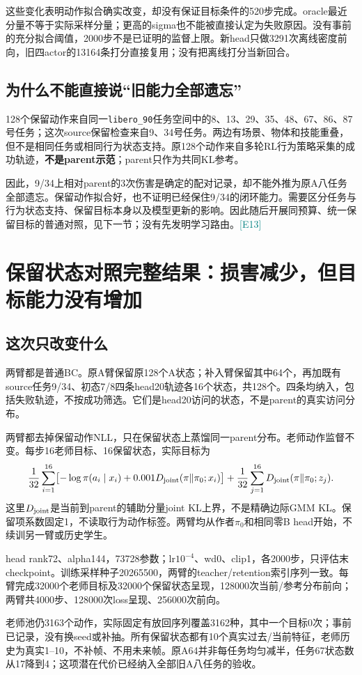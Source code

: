 \documentclass[UTF8,a4paper,fontset=none,zihao=-4]{ctexart}
\newcommand{\ev}[1]{\textcolor{teal}{\small[#1]}}
\begin{document}
这些变化表明动作拟合确实改变，却没有保证目标条件的520步完成。oracle最近分量不等于实际采样分量；更高的sigma也不能被直接认定为失败原因。没有事前的充分拟合阈值，2000步不是已证明的监督上限。新head只做3291次离线密度前向，旧四actor的13164条打分直接复用；没有把离线打分当新回合。
\subsection{为什么不能直接说“旧能力全部遗忘”}
128个保留动作来自同一\texttt{libero\_90}任务空间中的8、13、29、35、48、67、86、87号任务；这次source保留检查来自9、34号任务。两边有场景、物体和技能重叠，但不是相同任务或相同行为状态支持。原128个动作来自多轮RL行为策略采集的成功轨迹，\textbf{不是parent示范}；parent只作为共同KL参考。

因此，9/34上相对parent的3次伤害是确定的配对记录，却不能外推为原A八任务全部遗忘。保留动作拟合好，也不证明已经保住9/34的闭环能力。需要区分任务与行为状态支持、保留目标本身以及模型更新的影响。因此随后开展同预算、统一保留目标的普通对照，见下一节；没有先发明学习路由。\ev{E13}
\section{保留状态对照完整结果：损害减少，但目标能力没有增加}
\subsection{这次只改变什么}
两臂都是普通BC。原A臂保留原128个A状态；补入臂保留其中64个，再加既有source任务9/34、初态7/8四条head20轨迹各16个状态，共128个。四条均纳入，包括失败轨迹，不按成功筛选。它们是head20访问的状态，不是parent的真实访问分布。

两臂都去掉保留动作NLL，只在保留状态上蒸馏同一parent分布。老师动作监督不变。每步16老师目标、16保留状态，实际目标为
\[
\frac{1}{32}\sum_{i=1}^{16}\bigl[-\log\pi(a_i\mid x_i)+0.001D_{\rm joint}(\pi\Vert\pi_0;x_i)\bigr]
+\frac{1}{32}\sum_{j=1}^{16}D_{\rm joint}(\pi\Vert\pi_0;z_j).
\]
这里$D_{\rm joint}$是当前到parent的辅助分量joint KL上界，不是精确边际GMM KL。保留项系数固定1，不读取行为动作标签。两臂均从作者$\pi_0$和相同零B head开始，不续训另一臂或历史学生。

head rank72、alpha144，73728参数；lr$10^{-4}$、wd0、clip1，各2000步，只评估末checkpoint。训练采样种子20265500，两臂的teacher/retention索引序列一致。每臂完成32000个老师目标及32000个保留状态呈现，128000次当前/参考分布前向；两臂共4000步、128000次loss呈现、256000次前向。

老师池仍3163个动作，实际固定有放回序列覆盖3162种，其中一个目标0次；事前已记录，没有换seed或补抽。所有保留状态都有10个真实过去/当前特征，老师历史为真实1--10，不补帧、不用未来帧。原A64并非每任务均匀减半，任务67状态数从17降到4；这项潜在代价已经纳入全部旧A八任务的验收。
\end{document}
